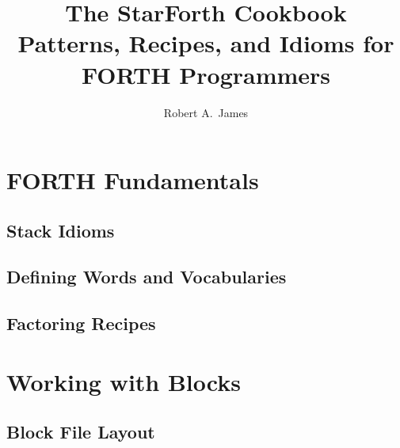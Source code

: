 


\title{The StarForth Cookbook\\[0.4em]
       \large Patterns, Recipes, and Idioms for FORTH Programmers}
\author{Robert A.\ James}
\date{%
}


\frontmatter
\maketitle
\tableofcontents

\mainmatter

\part{FORTH Fundamentals}

\chapter{Stack Idioms}

\chapter{Defining Words and Vocabularies}

\chapter{Factoring Recipes}

\part{Working with Blocks}

\chapter{Block File Layout}

